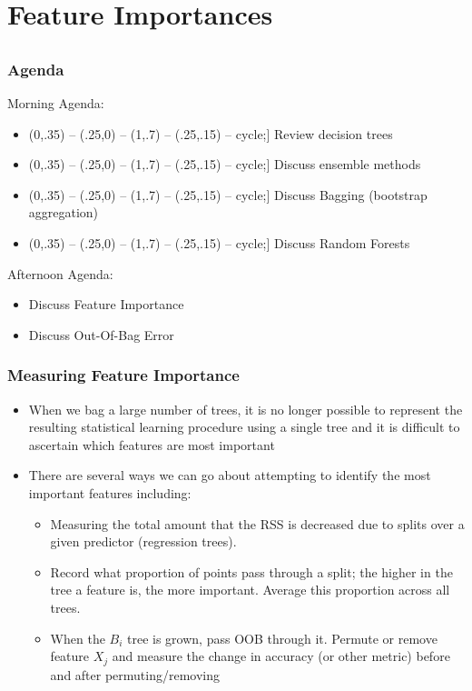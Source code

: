 \documentclass[table,dvipsnames]{beamer}
\def\checkmark{\tikz\fill[scale=0.4](0,.35) -- (.25,0) -- (1,.7) -- (.25,.15) -- cycle;}
\newcommand{\keywd}{\textcolor{myorange}}
\begin{document}
\section{Feature Importances}
\subsection{}

\begin{frame}
\frametitle{Agenda}
\scriptsize
Morning Agenda:

\begin{block}{}
\begin{itemize}
    \item[\checkmark] Review decision trees
    \item[\checkmark] Discuss ensemble methods
    \item[\checkmark] Discuss \keywd{Bagging} (bootstrap aggregation)
    \item[\checkmark] Discuss \keywd{Random Forests}
\end{itemize}
\end{block}

Afternoon Agenda:

\begin{block}{}
\begin{itemize}
    \item Discuss \keywd{Feature Importance}
    \item Discuss \keywd{Out-Of-Bag Error}
\end{itemize}
\end{block}
\end{frame}


\begin{frame}
\frametitle{Measuring Feature Importance}
\begin{itemize}
    \item When we bag a large number of trees, it is no longer possible to represent the resulting statistical learning procedure using a single tree and it is difficult to ascertain which features are most important
    \item There are several ways we can go about attempting to identify the most important features including:
    \begin{itemize}
        \item Measuring the total amount that the RSS is decreased due to splits over a given predictor (regression trees).
        \item Record what proportion of points pass through a split; the higher in the tree a feature is, the more important.  Average this proportion across all trees.
        \item When the $B_i$ tree is grown, pass OOB through it.  Permute or remove feature $X_j$ and measure the change in accuracy (or other metric) before and after permuting/removing
    \end{itemize}
\end{itemize}
\end{frame}
\end{document}
